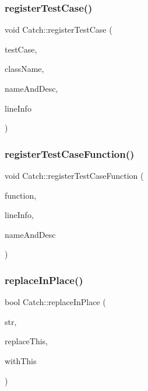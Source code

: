 \mbox{\label{namespace_catch_a9a59d681cc327a33c280796561dfe258}} 
\subsubsection{register\+Test\+Case()}
{\footnotesize\ttfamily void Catch\+::register\+Test\+Case (\begin{DoxyParamCaption}\item[{\textbf{ I\+Test\+Case} $\ast$}]{test\+Case,  }\item[{char const $\ast$}]{class\+Name,  }\item[{\textbf{ Name\+And\+Desc} const \&}]{name\+And\+Desc,  }\item[{\textbf{ Source\+Line\+Info} const \&}]{line\+Info }\end{DoxyParamCaption})}

\mbox{\label{namespace_catch_a220159aeff47f9c5231e893f2abbc643}} 
\subsubsection{register\+Test\+Case\+Function()}
{\footnotesize\ttfamily void Catch\+::register\+Test\+Case\+Function (\begin{DoxyParamCaption}\item[{\textbf{ Test\+Function}}]{function,  }\item[{\textbf{ Source\+Line\+Info} const \&}]{line\+Info,  }\item[{\textbf{ Name\+And\+Desc} const \&}]{name\+And\+Desc }\end{DoxyParamCaption})}

\mbox{\label{namespace_catch_afe4e6770da547e43e9e4eeaa05f946ea}} 
\subsubsection{replace\+In\+Place()}
{\footnotesize\ttfamily bool Catch\+::replace\+In\+Place (\begin{DoxyParamCaption}\item[{std\+::string \&}]{str,  }\item[{std\+::string const \&}]{replace\+This,  }\item[{std\+::string const \&}]{with\+This }\end{DoxyParamCaption})}

